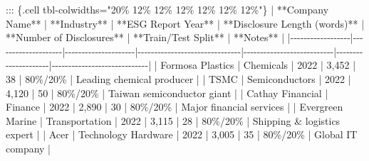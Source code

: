 \documentclass[
  12pt,
]{article}
\newenvironment{Shaded}{\begin{snugshade}}{\end{snugshade}}
\newcommand{\NormalTok}[1]{\textcolor[rgb]{0.00,0.23,0.31}{#1}}
\newcommand{\PreprocessorTok}[1]{\textcolor[rgb]{0.68,0.00,0.00}{#1}}
\begin{document}
\begin{Shaded}
\begin{Highlighting}[]
\NormalTok{::: \{.cell tbl{-}colwidths="20\% 12\% 12\% 12\% 12\% 12\% 12\%"\}}
\PreprocessorTok{|}\NormalTok{ **Company Name** | **Industry**       | **ESG Report Year** | **Disclosure Length (words)** | **Number of Disclosures** | **Train/Test Split** | **Notes**                   }\PreprocessorTok{|}
\PreprocessorTok{|{-}{-}{-}{-}{-}{-}{-}{-}{-}{-}{-}{-}{-}{-}{-}{-}{-}{-}|{-}{-}{-}{-}{-}{-}{-}{-}{-}{-}{-}{-}{-}{-}{-}{-}{-}{-}{-}{-}|{-}{-}{-}{-}{-}{-}{-}{-}{-}{-}{-}{-}{-}{-}{-}{-}{-}{-}{-}{-}{-}|{-}{-}{-}{-}{-}{-}{-}{-}{-}{-}{-}{-}{-}{-}{-}{-}{-}{-}{-}{-}{-}{-}{-}{-}{-}{-}{-}{-}{-}{-}{-}|{-}{-}{-}{-}{-}{-}{-}{-}{-}{-}{-}{-}{-}{-}{-}{-}{-}{-}{-}{-}{-}{-}{-}{-}{-}{-}{-}|{-}{-}{-}{-}{-}{-}{-}{-}{-}{-}{-}{-}{-}{-}{-}{-}{-}{-}{-}{-}{-}|{-}{-}{-}{-}{-}{-}{-}{-}{-}{-}{-}{-}{-}{-}{-}{-}{-}{-}{-}{-}{-}{-}{-}{-}{-}{-}{-}{-}{-}|}
\PreprocessorTok{|}\NormalTok{ Formosa Plastics }\PreprocessorTok{|}\NormalTok{ Chemicals          }\PreprocessorTok{|}\NormalTok{ 2022                }\PreprocessorTok{|}\NormalTok{ 3,452                         }\PreprocessorTok{|}\NormalTok{ 38                        }\PreprocessorTok{|}\NormalTok{ 80\%/20\%             }\PreprocessorTok{|}\NormalTok{ Leading chemical producer    }\PreprocessorTok{|}
\PreprocessorTok{|}\NormalTok{ TSMC             }\PreprocessorTok{|}\NormalTok{ Semiconductors      }\PreprocessorTok{|}\NormalTok{ 2022                }\PreprocessorTok{|}\NormalTok{ 4,120                         }\PreprocessorTok{|}\NormalTok{ 50                        }\PreprocessorTok{|}\NormalTok{ 80\%/20\%             }\PreprocessorTok{|}\NormalTok{ Taiwan semiconductor giant   }\PreprocessorTok{|}
\PreprocessorTok{|}\NormalTok{ Cathay Financial  }\PreprocessorTok{|}\NormalTok{ Finance             }\PreprocessorTok{|}\NormalTok{ 2022                }\PreprocessorTok{|}\NormalTok{ 2,890                         }\PreprocessorTok{|}\NormalTok{ 30                        }\PreprocessorTok{|}\NormalTok{ 80\%/20\%             }\PreprocessorTok{|}\NormalTok{ Major financial services     }\PreprocessorTok{|}
\PreprocessorTok{|}\NormalTok{ Evergreen Marine }\PreprocessorTok{|}\NormalTok{ Transportation      }\PreprocessorTok{|}\NormalTok{ 2022                }\PreprocessorTok{|}\NormalTok{ 3,115                         }\PreprocessorTok{|}\NormalTok{ 28                        }\PreprocessorTok{|}\NormalTok{ 80\%/20\%             }\PreprocessorTok{|}\NormalTok{ Shipping \& logistics expert  }\PreprocessorTok{|}
\PreprocessorTok{|}\NormalTok{ Acer             }\PreprocessorTok{|}\NormalTok{ Technology Hardware }\PreprocessorTok{|}\NormalTok{ 2022                }\PreprocessorTok{|}\NormalTok{ 3,005                         }\PreprocessorTok{|}\NormalTok{ 35                        }\PreprocessorTok{|}\NormalTok{ 80\%/20\%             }\PreprocessorTok{|}\NormalTok{ Global IT company            }\PreprocessorTok{|}

\end{Highlighting}
\end{Shaded}
\end{document}
